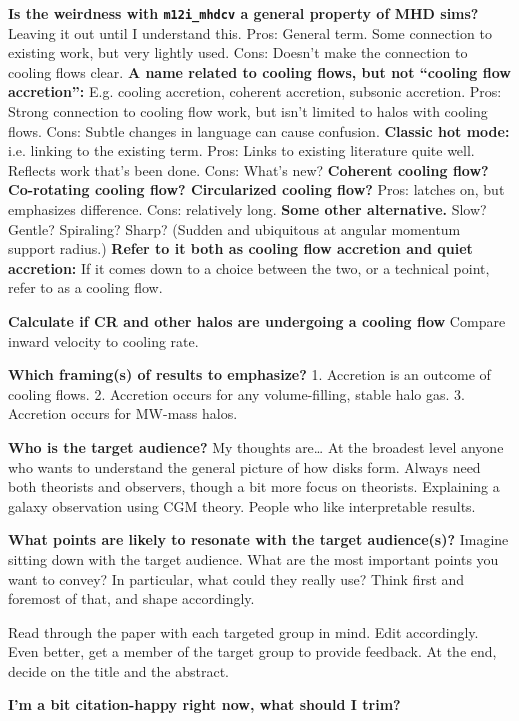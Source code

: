 \documentclass[fleqn,usenatbib]{mnras}
\begin{document}
\textbf{Is the weirdness with \texttt{m12i\_mhdcv} a general property of MHD sims?}
Leaving it out until I understand this.																																								
Pros: General term. Some connection to existing work, but very lightly used.
Cons: Doesn't make the connection to cooling flows clear.
\textbf{A name related to cooling flows, but not ``cooling flow accretion'':}
E.g. cooling accretion, coherent accretion, subsonic accretion.
Pros: Strong connection to cooling flow work, but isn't limited to halos with cooling flows.
Cons: Subtle changes in language can cause confusion.
\textbf{Classic hot mode:}
i.e. linking to the existing term.
Pros: Links to existing literature quite well. Reflects work that's been done.
Cons: What's new?
\textbf{Coherent cooling flow? Co-rotating cooling flow? Circularized cooling flow?}
Pros: latches on, but emphasizes difference.
Cons: relatively long.
\textbf{Some other alternative.}
Slow?
Gentle?
Spiraling?
Sharp? (Sudden and ubiquitous at angular momentum support radius.)
\textbf{Refer to it both as cooling flow accretion and quiet accretion:}
If it comes down to a choice between the two, or a technical point, refer to as a cooling flow.

\textbf{Calculate if CR and other halos are undergoing a cooling flow}
Compare inward velocity to cooling rate.

\textbf{
Which framing(s) of results to emphasize?
}
1. Accretion is an outcome of cooling flows.
2. Accretion occurs for any volume-filling, stable halo gas.
3. Accretion occurs for MW-mass halos.

\textbf{
Who is the target audience?
}
My thoughts are\ldots
At the broadest level anyone who wants to understand the general picture of how disks form.
Always need both theorists and observers, though a bit more focus on theorists.
Explaining a galaxy observation using CGM theory.
People who like interpretable results.

\textbf{What points are likely to resonate with the target audience(s)?}
Imagine sitting down with the target audience.
What are the most important points you want to convey?
In particular, what could they really use?
Think first and foremost of that, and shape accordingly.

Read through the paper with each targeted group in mind.
Edit accordingly.
Even better, get a member of the target group to provide feedback.
At the end, decide on the title and the abstract.

\textbf{I'm a bit citation-happy right now, what should I trim?}
\end{document}
